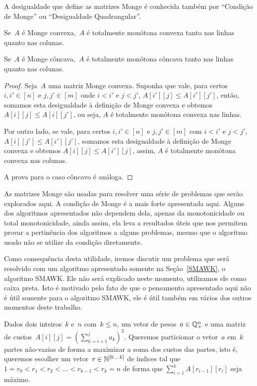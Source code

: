 A desigualdade que define as matrizes Monge é conhecida também por ``Condição de Monge'' ou ``Desigualdade Quadrangular''.

\begin{lema}
Se~$A$ é Monge convexa,~$A$ é totalmente monótona convexa tanto nas linhas quanto nas colunas.  

Se~$A$ é Monge côncava,~$A$ é totalmente monótona côncava tanto nas linhas quanto nas colunas.
\end{lema}

\begin{proof}
Seja~$A$ uma matriz Monge convexa. Suponha que vale, para certos $i,i' \in [n]$ e $j,j' \in [m]$ onde $i < i'$ e $j < j'$, $A[i'][j] \leq A[i'][j']$, então, somamos esta desigualdade à definição de Monge convexa e obtemos $A[i][j] \leq A[i][j']$, ou seja, $A$ é totalmente monótona convexa nas linhas.  

Por outro lado, se vale, para certos $i,i' \in [n]$ e $j,j' \in [m]$ com $i < i'$ e $j < j'$, $A[i][j'] \leq A[i'][j']$, somamos esta desigualdade à definição de Monge convexa e obtemos $A[i][j] \leq A[i'][j]$, assim, $A$ é totalmente monótona convexa nas colunas.  

A prova para o caso côncavo é análoga.
\end{proof}

As matrizes Monge são usadas para resolver uma série de problemas que serão explorados aqui. A condição de Monge é a mais forte apresentada aqui. Alguns dos algoritmos apresentados não dependem dela, apenas da monotonicidade ou total monotonicidade, ainda assim, ela leva a resultados úteis que nos permitem provar a pertinência dos algoritmos a alguns problemas, mesmo que o algoritmo usado não se utilize da condição diretamente.  

Como consequência desta utilidade, iremos discutir um problema que será resolvido com um algoritmo apresentado somente na Seção~\ref{SMAWK}, o algoritmo SMAWK. Ele não será explicado neste momento, utilizamos ele como caixa preta. Isto é motivado pelo fato de que o pensamento apresentado aqui não é útil somente para o algoritmo SMAWK, ele é útil também em vários dos outros momentos deste trabalho.  

\begin{prob} \label{prob:Monge_ex}
Dados dois inteiros~$k$ e~$n$ com~$k \leq n$, um vetor de pesos~$a \in \mathbb{Q}_+^n$ e uma matriz de custos~${A[i][j] = \left(\sum\limits_{k=i+1}^{j} a_k\right)^2}$. Queremos particionar o vetor~$a$ em~$k$ partes não-vazias de forma a maximizar a soma dos custos das partes, isto é, queremos escolher um vetor~${r \in \mathbb{N}^{[0 \,.\,.\, k]}}$ de índices tal que~${1 = r_0 < r_1 < r_2 < \dots < r_{k-1} < r_k = n}$ de forma que $\sum\limits_{i=1}^{k} A[r_{i-1}][r_i]$ seja máximo.
\end{prob}

